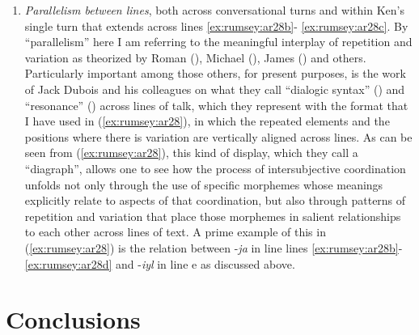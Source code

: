\documentclass[output=paper]{langsci/langscibook}
\begin{document}
\begin{enumerate}
	\item \emph{Parallelism between lines}, both across conversational turns and within Ken’s single turn that extends across lines  \ref{ex:rumsey:ar28b}- \ref{ex:rumsey:ar28c}. By “parallelism” here I am referring to the meaningful interplay of repetition and variation as theorized by Roman \citeauthor{Jakobson1960} (\citeyear{Jakobson1960}), Michael \citeauthor{Silverstein2004} (\citeyear{Silverstein2004}), James \citeauthor{Fox2014} (\citeyear{Fox2014}) and others. Particularly important among those others, for present purposes, is the work of Jack Dubois and his colleagues on what they call “dialogic syntax” (\citealt{DuBois2014}) and “resonance” (\citealt{DuBoisGloria2014}) across lines of talk, which they represent with the format that I have used in (\ref{ex:rumsey:ar28}), in which the repeated elements and the positions where there is variation are vertically aligned across lines. As can be seen from (\ref{ex:rumsey:ar28}), this kind of display, which they call a “diagraph”, allows one to see how the process of intersubjective coordination unfolds not only through the use of specific morphemes whose meanings explicitly relate to aspects of that coordination, but also through patterns of repetition and variation that place those morphemes in salient relationships to each other across lines of text. A prime example of this in (\ref{ex:rumsey:ar28}) is the relation between -\textit{ja} in line lines \ref{ex:rumsey:ar28b}-\ref{ex:rumsey:ar28d} and -\textit{iyl} in line e as discussed above.
\end{enumerate}


\section{Conclusions}\label{s:ar8}
\end{document}
